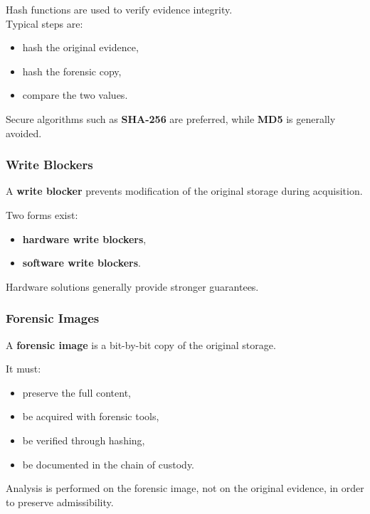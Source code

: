 Hash functions are used to verify evidence integrity.
\\
Typical steps are:

\begin{itemize}
\item hash the original evidence,
\item hash the forensic copy,
\item compare the two values.
\end{itemize}

\noindent
Secure algorithms such as \textbf{SHA-256} are preferred, while \textbf{MD5} is generally avoided.

\subsubsection{Write Blockers}

A \textbf{write blocker} prevents modification of the original storage during acquisition.

\noindent
Two forms exist:

\begin{itemize}
\item \textbf{hardware write blockers},
\item \textbf{software write blockers}.
\end{itemize}

\noindent
Hardware solutions generally provide stronger guarantees.

\subsubsection{Forensic Images}

A \textbf{forensic image} is a bit-by-bit copy of the original storage.

\noindent
It must:

\begin{itemize}
\item preserve the full content,
\item be acquired with forensic tools,
\item be verified through hashing,
\item be documented in the chain of custody.
\end{itemize}

\noindent
Analysis is performed on the forensic image, not on the original evidence, in order to preserve admissibility.